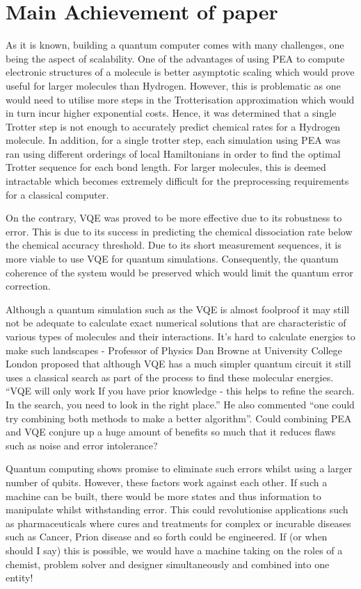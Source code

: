 \documentclass[12pt]{article}
\begin{document}
\section{Main Achievement of paper}
As it is known, building a quantum computer comes with many challenges, one being the aspect of scalability. One of the advantages of using PEA to
compute electronic structures of a molecule is better asymptotic scaling which would prove useful for larger molecules than Hydrogen. However, this
is problematic as one would need to utilise more steps in the Trotterisation approximation which would in turn incur higher exponential costs. Hence,
 it was determined that a single Trotter step is not enough to accurately predict chemical rates for a Hydrogen molecule. In addition, for a single
 trotter step, each simulation using PEA was ran using different orderings of local Hamiltonians in order to find the optimal Trotter sequence for
 each bond length. For larger molecules, this is deemed intractable which becomes extremely difficult for the preprocessing requirements for a
 classical computer.

On the contrary, VQE was proved to be more effective due to its robustness to error. This is due to its success in predicting the chemical dissociation
 rate below the chemical accuracy threshold. Due to its short measurement sequences, it is more viable to use VQE for quantum simulations.
 Consequently, the quantum coherence of the system would be preserved which would limit the quantum error correction.

 Although a quantum simulation such as the VQE is almost foolproof it may still not be adequate to calculate exact numerical solutions that are
 characteristic of various types of molecules and their interactions. It’s hard to calculate energies to make such landscapes - Professor of Physics
 Dan Browne at University College London proposed that although VQE has a much simpler quantum circuit it still uses a classical search as part of
 the process to find these molecular energies. ``VQE will only work If you have prior knowledge - this helps to refine the search. In the search, you
 need to look in the right place.” He also commented “one could try combining both methods to make a better algorithm”. Could combining PEA and VQE
 conjure up a huge amount of benefits so much that it reduces flaws such as noise and error intolerance?

 Quantum computing shows promise to eliminate such errors whilst using a larger number of qubits. However, these factors work against each other.
 If such a machine can be built, there would be more states and thus information to manipulate whilst withstanding error. This could revolutionise
 applications such as pharmaceuticals where cures and treatments for complex or incurable diseases such as Cancer, Prion disease and so forth could
 be engineered. If (or when should I say) this is possible,  we would have a machine taking on the roles of a chemist, problem solver and designer
  simultaneously and combined into one entity!
\end{document}
